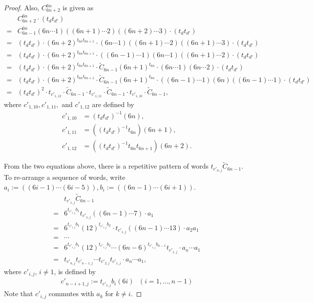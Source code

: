 \documentclass[10pt,a4paper,reqno]{amsart}
\theoremstyle{definition}
\numberwithin{equation}{section}
\numberwithin{figure}{section}
\begin{document}
\begin{proof}
Also, $C_{6n+2}^{6n}$ is given as
\begin{align*}
&C_{6n+2}^{6n}\cdot (t_{d} t_{d'})\\
=&C_{6n-1}^{6n}(6n \cdots 1)((6n+1) \cdots 2)((6n+2)\cdots 3) \cdot (t_{d} t_{d'})\\
=&(t_{d} t_{d'}) \cdot (6n+2)^{t_{6n}t_{6n+1}}\cdot (6n \cdots 1) ((6n+1) \cdots 2)((6n+1)\cdots 3)\cdot (t_{d} t_{d'})\\
=&(t_{d} t_{d'}) \cdot (6n+2)^{t_{6n}t_{6n+1}}\cdot ((6n-1)\cdots 1) (6n \cdots 1) ((6n+1) \cdots 2)\cdot (t_{d} t_{d'})\\
=&(t_{d} t_{d'}) \cdot (6n+2)^{t_{6n}t_{6n+1}}\cdot \tilde{C}_{6n-1} (6n+1)^{t_{6n}}\cdot(6n \cdots 1) (6n \cdots 2)\cdot (t_{d} t_{d'})\\
=&(t_{d} t_{d'}) \cdot (6n+2)^{t_{6n}t_{6n+1}}\cdot \tilde{C}_{6n-1}  (6n+1)^{t_{6n}}\cdot((6n-1)\cdots 1) (6n)  ((6n-1) \cdots 1)\cdot (t_{d} t_{d'})\\
=&(t_{d} t_{d'})^2 \cdot  t_{{c}'_{1,12}}\cdot \tilde{C}_{6n-1} \cdot t_{{c}'_{1,11}}\cdot \tilde{C}_{6n-1} \cdot t_{{c}'_{1,10}} \cdot \tilde{C}_{6n-1},
\end{align*}
where ${c}'_{1,10},  {c}'_{1,11},$ and ${c}'_{1,12}$ are defined by
\begin{align}
{c}'_{1,10}&=(t_{d} t_{d'})^{-1}(6n), \\
{c}'_{1,11}&= ((t_{d} t_{d'})^{-1}t_{6n})(6n+1), \\
{c}'_{1,12}&=((t_{d} t_{d'})^{-1}t_{6n}t_{6n+1})(6n+2).
\end{align}

From the two equations above, there is a repetitive pattern of words $t_{{c}'_{n,j}}\tilde{C}_{6n-1}$.
To re-arrange a sequence of words, write $a_i:=((6i-1)\cdots (6i-5)), b_i:= ((6n-1) \cdots (6i+1))$.
\begin{align*}
&t_{{c}'_{1,j}}\tilde{C}_{6n-1} \\
=&6^{t_{{c}'_{1,j}} b_1} t_{{c}'_{1,j}}((6n-1)\cdots 7) \cdot a_1 \\
=&6^{t_{{c}'_{1,j}} b_1} (12)^{t_{{c}'_{1,j}} b_2}\cdot t_{{c}'_{1,j}}  ((6n-1)\cdots 13) \cdot  a_2 a_1 \\
=&\cdots \\
=&6^{t_{{c}'_{1,j}} b_1} (12)^{t_{{c}'_{1,j}} b_2}\cdots (6n-6)^{t_{{c}'_{1,j}}b_{n-1}}t_{{c}'_{1,j}} \cdot a_n \cdots a_1 \\
=&t_{{c}'_{n,j}} t_{{c}'_{n-1,j}} \cdots t_{{c}'_{2,j}}t_{{c}'_{1,j}} \cdot a_n \cdots a_1,
\end{align*}
where ${c}'_{i,j}$, $i\neq 1$, is defined by
\begin{align}
{c}'_{n-i+1,j}:={t_{{c}'_{1,j}} b_i}(6i) \text{ }(i=1,\dots, n-1)
\end{align}
Note that ${c}'_{i,j}$ commutes with $a_k$ for $k\neq i$.


\end{proof}
\end{document}
